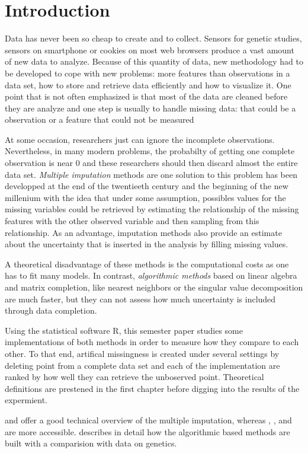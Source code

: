 \chapter{Introduction}

Data has never been so cheap to create and to collect. Sensors for genetic
studies, sensors on smartphone or cookies on most web browsers produce a vast
amount of new data to analyze. Because of this quantity of data, new
methodology had to be developed to cope with new problems: more features than
observations in a data set, how to store and retrieve data efficiently and how
to visualize it. One point that is not often emphasized is that most of the
data are cleaned before they are analyze and one step is usually to handle
missing data: that could be a observation or a feature that could not be
measured

At some occasion, researchers just can ignore the incomplete
observations. Nevertheless, in many modern problems, the probabilty of getting
one complete observation is near $0$ and these researchers should then discard
almost the entire data set.  \emph{Multiple imputation} methods are one
solution to this problem has been developped at the end of the twentieeth
century and the beginning of the new millenium with the idea that under some
assumption, possibles values for the missing variables could be retrieved
by estimating the relationship of the missing features with the other observed
variable and then sampling from this relationship. As an advantage, imputation
methods also provide an estimate about the uncertainty that is inserted in the
analysis by filling missing values.

A theoretical disadvantage of these methods is the computational costs as one
has to fit many models.  In contrast, \emph{algorithmic methods} based on
linear algebra and matrix completion, like nearest neighbors or the singular
value decomposition are much faster, but they can not assess how much
uncertainty is included through data completion.

Using the statistical software R, this semester paper studies some
implementations of both methods in order to measure how they compare to each
other. To that end, artifical missingness is created under several settings by
deleting point from a complete data set and each of the implementation are
ranked by how well they can retrieve the unboserved point. Theoretical
definitions are prestened in the first chapter before digging into the results
of the expermient.

\cite{schafer2002missing} and \cite{little2002statistical} offer a good
technical overview of the multiple imputation, whereas \cite{van2012flexible},
\cite{gelman2006data}, and \cite{matloffblog2015} are more
accessible. \cite{troyanskaya2001missing} describes in detail how the
algorithmic based methods are built with a comparision with data on genetics.

